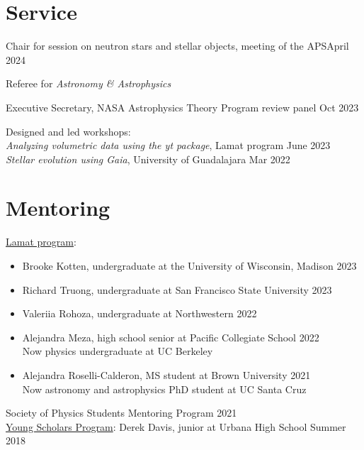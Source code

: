 \documentclass[12pt]{article}
\begin{document}

\section*{Service}
Chair for session on neutron stars and stellar objects, meeting of the APS\hfill April 2024

Referee for \textit{Astronomy \& Astrophysics}

Executive Secretary, NASA Astrophysics Theory Program review panel \hfill Oct 2023

Designed and led workshops:\\
\textit{Analyzing volumetric data using the yt package}, Lamat program \hfill June 2023\\
\textit{Stellar evolution using Gaia}, University of Guadalajara \hfill Mar 2022


\section*{Mentoring}
\href{http://astrolamat.sivtes.ucsc.edu/}{Lamat program}:
\begin{itemize}
  \item Brooke Kotten, undergraduate at the University of Wisconsin, Madison \hfill 2023
  \item Richard Truong, undergraduate at San Francisco State University \hfill 2023
  \item Valeriia Rohoza, undergraduate at Northwestern \hfill 2022
  \item Alejandra Meza, high school senior at Pacific Collegiate School \hfill 2022\\Now physics undergraduate at UC Berkeley
  \item Alejandra Roselli-Calderon, MS student at Brown University \hfill 2021\\Now astronomy and astrophysics PhD student at UC Santa Cruz
\end{itemize}

Society of Physics Students Mentoring Program \hfill 2021\\
\href{https://physics.illinois.edu/outreach/young-scholars}{Young Scholars Program}: Derek Davis, junior at Urbana High School \hfill Summer 2018
\end{document}
